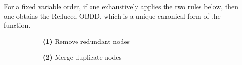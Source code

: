 \documentclass[english, aspectratio=169]{beamer}
\begin{document}
\begin{frame}
  \begin{theorem}[Bryant '86]
    For a fixed variable order, if one exhaustively applies the two rules below,
    then one obtains the Reduced OBDD, which is a unique canonical form of the
    function.
  \end{theorem}

  \begin{figure}
    \centering

    \begin{subfigure}[b]{0.40\linewidth}
      \centering

      \begin{tikzpicture}[scale=0.9, every node/.style={transform shape}]
        
      \end{tikzpicture}

      \vspace{10pt}
      {\small {\bf (1)} Remove redundant nodes}
    \end{subfigure}
    \begin{subfigure}[b]{0.59\linewidth}
      \centering

      \begin{tikzpicture}[scale=0.9, every node/.style={transform shape}]
        
      \end{tikzpicture}

      \vspace{10pt}
      {\small {\bf (2)} Merge duplicate nodes}
    \end{subfigure}

  \end{figure}

\end{frame}
\end{document}
